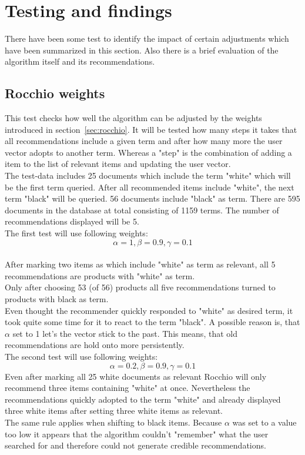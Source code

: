 
\section{Testing and findings}
\label{sec:testing-findings}
There have been some test to identify the impact of certain adjustments which have been summarized in this section.
Also there is a brief evaluation of the algorithm itself and its recommendations.


\subsection{Rocchio weights}
\label{sec:rocchio-weights}
This test checks how well the algorithm can be adjusted by the weights introduced in section~\ref{sec:rocchio}.
It will be tested how many steps it takes that all recommendations include a given term and after how many more the user vector adopts to another term.
Whereas a "step" is the combination of adding a item to the list of relevant items and updating the user vector.
\\
The test-data includes 25 documents which include the term "white" which will be the first term queried.
After all recommended items include "white", the next term "black" will be queried.
56 documents include "black" as term.
There are 595 documents in the database at total consisting of 1159 terms.
The number of recommendations displayed will be 5.
\\

\noindent
The first test will use following weights:
\\
$$\alpha = 1, \beta = 0.9, \gamma = 0.1$$
\\
After marking two items as which include "white" as term as relevant, all 5 recommendations are products with "white" as term.
\\
Only after choosing 53 (of 56) products all five recommendations turned to products with black as term.
\\
Even thought the recommender quickly responded to "white" as desired term, it took quite some time for it to react to the term "black".
A possible reason is, that $\alpha$ set to 1 let's the vector stick to the past.
This means, that old recommendations are hold onto more persistently.
\\

\noindent
The second test will use following weights:
\\
$$\alpha = 0.2, \beta = 0.9, \gamma = 0.1$$
Even after marking all 25 white documents as relevant Rocchio will only recommend three items containing "white" at once.
Nevertheless the recommendations quickly adopted to the term "white" and already displayed three white items after setting three white items as relevant.
\\
The same rule applies when shifting to black items.
Because $\alpha$ was set to a value too low it appears that the algorithm couldn't "remember" what the user searched for and therefore could not generate credible recommendations.
\\

